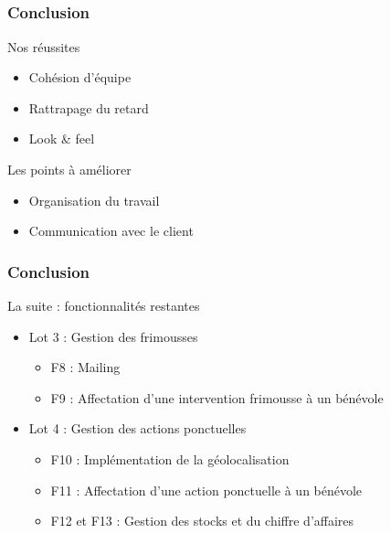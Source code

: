 \subsection{} %

\speaker{\Francois}
\begin{frame}
\frametitle{Conclusion}
\begin{block}{Nos réussites}
	\begin{itemize}
		\item Cohésion d'équipe
		\item Rattrapage du retard
		\item Look \& feel
	\end{itemize}
\end{block}
\begin{block}{Les points à améliorer}
	\begin{itemize}
		\item Organisation du travail
		\item Communication avec le client
	\end{itemize}
\end{block}
\end{frame}
	
\begin{frame}
\frametitle{Conclusion}
\begin{block}{La suite : fonctionnalités restantes}
	\begin{itemize}
		\item Lot 3 : Gestion des frimousses
		\begin{itemize}
			\item F8 : Mailing
			\item F9 : Affectation d'une intervention frimousse à un bénévole
		\end{itemize}
		\vspace{.5cm}
		\item Lot 4 : Gestion des actions ponctuelles
		\begin{itemize}
			\item F10 : Implémentation de la géolocalisation
			\item F11 : Affectation d'une action ponctuelle à un bénévole
			\item F12 et F13 : Gestion des stocks et du chiffre d'affaires
		\end{itemize}
	\end{itemize}
\end{block}
\end{frame}
